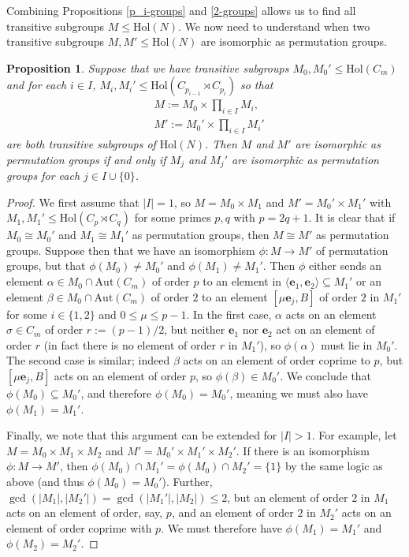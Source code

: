 \documentclass[a4paper,reqno]{amsart}
\newtheorem{proposition}[theorem]{Proposition}
\theoremstyle{definition}
\newcommand{\e}{\textbf{e}}
\newcommand{\Aut}{\mathrm{Aut}}
\newcommand{\Hol}{\mathrm{Hol}}
\begin{document}
Combining Propositions \ref{p_i-groups} and \ref{2-groups} allows us to find all transitive subgroups $M \leq \Hol(N)$. We now need to understand when two transitive subgroups $M,M' \leq \Hol(N)$ are isomorphic as permutation groups.
\begin{proposition}\label{direct_isoms}
    Suppose that we have transitive subgroups $M_0,M_0' \leq \Hol(C_m)$ and for each $i \in I$, $M_i,M_i' \leq \Hol(C_{p_{i-1}} \rtimes C_{p_i})$ so that
    \begin{align*}
        &M:=M_0 \times \prod_{i \in I}M_i,\\
        &M':=M_0' \times \prod_{i \in I}M_i'
    \end{align*}
    are both transitive subgroups of $\Hol(N)$. Then $M$ and $M'$ are isomorphic as permutation groups if and only if $M_j$ and $M_j'$ are isomorphic as permutation groups for each $j \in I \cup \{0\}$.
\end{proposition}
\begin{proof}
    We first assume that $|I|=1$, so $M=M_0 \times M_1$ and $M'=M_0' \times M_1'$ with $M_1,M_1' \leq \Hol(C_p \rtimes C_q)$ for some primes $p,q$ with $p=2q+1$. It is clear that if $M_0 \cong M_0'$ and $M_1 \cong M_1'$ as permutation groups, then $M \cong M'$ as permutation groups. Suppose then that we have an isomorphism $\phi: M \to M'$ of permutation groups, but that $\phi(M_0) \neq M_0'$ and $\phi(M_1) \neq M_1'$. Then $\phi$ either sends an element $\alpha \in M_0 \cap \Aut(C_m)$ of order $p$ to an element in $\langle \e_1,\e_2 \rangle \subseteq M_1'$ or an element $\beta \in M_0 \cap \Aut(C_m)$ of order $2$ to an element $[\mu\e_j,B]$ of order $2$ in  $M_1'$ for some $i \in \{1,2\}$ and $0 \leq \mu \leq p-1$. In the first case, $\alpha$ acts on an element $\sigma \in C_m$ of order $r:=(p-1)/2$, but neither $\e_1$ nor $\e_2$ act on an element of order $r$ (in fact there is no element of order $r$ in $M_1'$), so $\phi(\alpha)$ must lie in $M_0'$. The second case is similar; indeed $\beta$ acts on an element of order coprime to $p$, but $[\mu\e_j,B]$ acts on an element of order $p$, so $\phi(\beta) \in M_0'$. We conclude that $\phi(M_0) \subseteq M_0'$, and therefore $\phi(M_0) = M_0'$, meaning we must also have $\phi(M_1)=M_1'$.

    Finally, we note that this argument can be extended for $|I|>1$. For example, let $M=M_0 \times M_1 \times M_2$ and $M'=M_0' \times M_1' \times M_2'$. If there is an isomorphism $\phi:M \to M'$, then $\phi(M_0) \cap M_1'=\phi(M_0) \cap M_2' = \{1\}$ by the same logic as above (and thus $\phi(M_0)=M_0'$). Further, $\gcd(|M_1|,|M_2'|)=\gcd(|M_1'|,|M_2|) \leq 2$, but an element of order $2$ in $M_1$ acts on an element of order, say, $p$, and an element of order $2$ in $M_2'$ acts on an element of order coprime with $p$. We must therefore have $\phi(M_1)=M_1'$ and $\phi(M_2)=M_2'$.
\end{proof}
\end{document}
